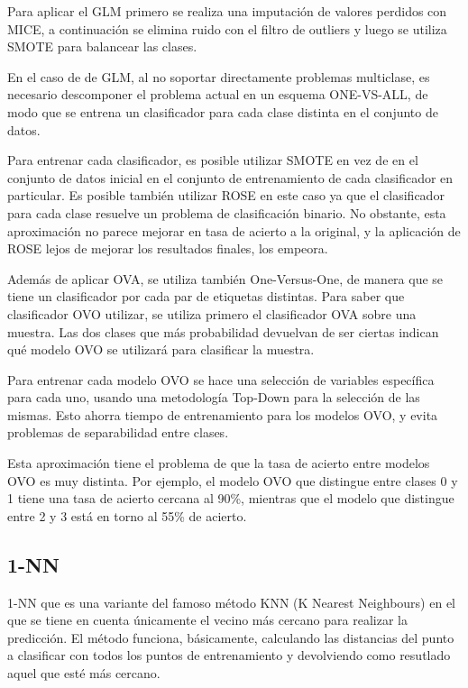 \documentclass[]{scrartcl}
\begin{document}
Para aplicar el GLM primero se realiza una imputación de valores perdidos con MICE, a continuación se elimina ruido con el filtro de outliers y luego se utiliza SMOTE para balancear las clases.


En el caso de de GLM, al no soportar directamente problemas multiclase, es necesario descomponer el problema actual en un esquema ONE-VS-ALL, de modo que se entrena un clasificador para cada clase distinta en el conjunto de datos.


Para entrenar cada clasificador, es posible utilizar SMOTE en vez de en el conjunto de datos inicial en el conjunto de entrenamiento de cada clasificador en particular. Es posible también utilizar ROSE en este caso ya que el clasificador para cada clase resuelve un problema de clasificación binario. No obstante, esta aproximación no parece mejorar en tasa de acierto a la original, y la aplicación de ROSE lejos de mejorar los resultados finales, los empeora.


Además de aplicar OVA, se utiliza también One-Versus-One, de manera que se tiene un clasificador por cada par de etiquetas distintas. Para saber que clasificador OVO utilizar, se utiliza primero el clasificador OVA sobre una muestra. Las dos clases que más probabilidad devuelvan de ser ciertas indican qué modelo OVO se utilizará para clasificar la muestra. 


Para entrenar cada modelo OVO se hace una selección de variables específica para cada uno, usando una metodología Top-Down para la selección de las mismas. Esto ahorra tiempo de entrenamiento para los modelos OVO, y evita problemas de separabilidad entre clases.


Esta aproximación tiene el problema de que la tasa de acierto entre modelos OVO es muy distinta. Por ejemplo, el modelo OVO que distingue entre clases 0 y 1 tiene una tasa de acierto cercana al 90\%, mientras que el modelo que distingue entre 2 y 3 está en torno al 55\% de acierto.

\subsection{1-NN}
1-NN que es una variante del famoso método KNN (K Nearest Neighbours) en el que se tiene en cuenta únicamente el vecino más cercano para realizar la predicción. El método funciona, básicamente, calculando las distancias del punto a clasificar con todos los puntos de entrenamiento y devolviendo como resutlado aquel que esté más cercano.
\end{document}
